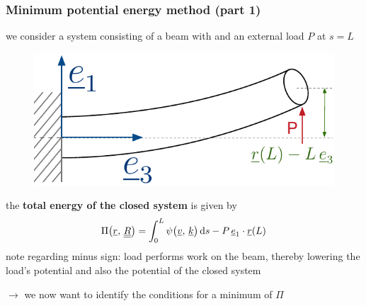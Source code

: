 \begin{frame}
  \frametitle{Minimum potential energy method (part 1)}
  
  we consider a system consisting of a beam with and an external load $P$ at $s=L$
  
  \vspace{-0.3em}
  \begin{figure}
    \centering
    \includegraphics[width=14cm, keepaspectratio=true]{sections/cosserat_rods/images/MinimumPotentialEnergyMethodExample}
  \end{figure}
  
  the \textbf{total energy of the closed system} is given by
  \begin{displaymath}
    \Pi \bigl( \underline{r}, \, \doubleunderline{R} \bigr) =
    \int_0^L \psi \bigl( \underline{v} , \, \underline{k} \bigr) \dif s - P \, \underline{e}_1 \cdot \underline{r}(L)
  \end{displaymath}
  note regarding minus sign: load performs work on the beam, \newline
  thereby lowering the load's potential and also the potential of the closed system
  
  \vspace{0.3em}
  $\rightarrow$ we now want to identify the conditions for a minimum of $\Pi$
\end{frame}


